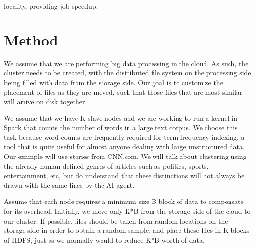 \documentclass[12pt]{extarticle}
\begin{document}
locality, providing job speedup.

\section{Method}
We assume that we are performing big data processing in the cloud.  As such, the cluster needs to be created, with the distributed file system on the processing side being filled with data from the storage side.  Our goal is to customize the placement of files as they are moved, such that those files that are most similar will arrive on disk together.  


We assume that we have K slave-nodes and we are working to run a kernel in Spark that counts the number of words in a large text corpus.  We choose this task because word counts are frequently required for term-frequency indexing, a tool that is quite useful for almost anyone dealing with large unstructured data.  Our example will use stories from CNN.com.  We will talk about clustering using the already human-defined genres of articles such as politics, sports, entertainment, etc, but do understand that these distinctions will not always be drawn with the same lines by the AI agent. 

Assume that each node requires a minimum size B block of data to compensate for its overhead.  Initially, we move only K*B from the storage side of the cloud to our cluster.  If possible, files should be taken from random locations on the storage side in order to obtain a random sample, and place these files in K blocks of HDFS, just as we normally would to reduce K*B worth of data.  
\end{document}
